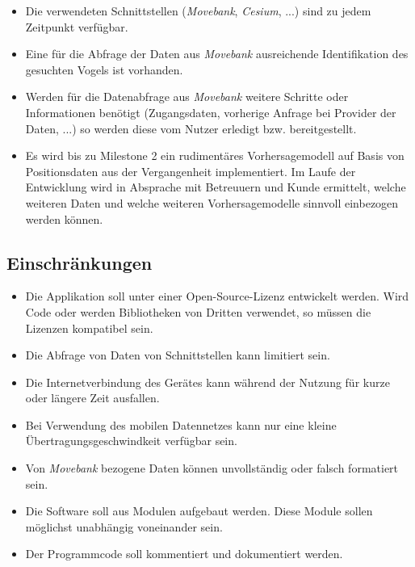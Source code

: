 \documentclass[12pt]{article} %
\begin{document}
\begin{itemize} 
 	 \item Die verwendeten Schnittstellen (\textit{Movebank}, \textit{Cesium}, ...) sind zu jedem Zeitpunkt verfügbar.
 	 \item Eine für die Abfrage der Daten aus \textit{Movebank} ausreichende Identifikation des gesuchten Vogels ist vorhanden.
 	 \item Werden für die Datenabfrage aus \textit{Movebank} weitere Schritte oder Informationen benötigt (Zugangsdaten, vorherige Anfrage bei Provider der Daten, ...) so werden diese vom Nutzer erledigt bzw. bereitgestellt.
 	 \item Es wird bis zu Milestone 2 ein rudimentäres Vorhersagemodell auf Basis von Positionsdaten aus der Vergangenheit implementiert. Im Laufe der Entwicklung wird in Absprache mit Betreuuern und Kunde ermittelt, welche weiteren Daten und welche weiteren Vorhersagemodelle sinnvoll einbezogen werden können.
\end{itemize} 


\subsection{Einschränkungen}

\begin{itemize} 
	\item Die Applikation soll unter einer Open-Source-Lizenz entwickelt werden. Wird Code oder werden Bibliotheken von Dritten verwendet, so müssen die Lizenzen kompatibel sein.
	\item Die Abfrage von Daten von Schnittstellen kann limitiert sein.
	\item Die Internetverbindung des Gerätes kann während der Nutzung für kurze oder längere Zeit ausfallen.
	\item Bei Verwendung des mobilen Datennetzes kann nur eine kleine Übertragungsgeschwindkeit verfügbar sein.
	\item Von \textit{Movebank} bezogene Daten können unvollständig oder falsch formatiert sein.
	\item Die Software soll aus Modulen aufgebaut werden. Diese Module sollen möglichst unabhängig voneinander sein.
	\item Der Programmcode soll kommentiert und dokumentiert werden.
\end{itemize} 
\end{document}

